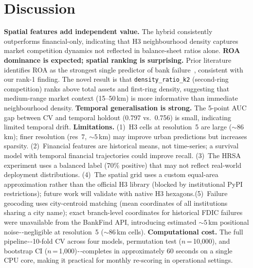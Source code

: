 \documentclass[conference]{IEEEtran}
\begin{document}
\section{Discussion}
\textbf{Spatial features add independent value.} The hybrid consistently
outperforms financial-only, indicating that H3 neighbourhood density
captures market competition dynamics not reflected in balance-sheet ratios
alone.
\textbf{ROA dominance is expected; spatial ranking is surprising.} Prior
literature identifies ROA as the strongest single predictor of bank
failure~\cite{cole1998,betz2014}, consistent with our rank-1 finding.
The novel result is that \texttt{density\_ratio\_k2} (second-ring
competition) ranks above total assets and first-ring density, suggesting
that medium-range market context (15–50\,km) is more informative than
immediate neighbourhood density.
\textbf{Temporal generalisation is strong.} The 5-point AUC gap between
CV and temporal holdout (0.797 vs.\ 0.756) is small, indicating limited
temporal drift.
\textbf{Limitations.}
(1)~H3 cells at resolution~5 are large (${\sim}86$\,km); finer resolution
(res~7, ${\sim}5$\,km) may improve urban predictions but increases
sparsity.
(2)~Financial features are historical means, not time-series; a survival
model with temporal financial trajectories could improve recall.
(3)~The HRSA experiment uses a balanced label (70\% positive) that may
not reflect real-world deployment distributions.
(4)~The spatial grid uses a custom equal-area approximation rather than
the official H3 library (blocked by institutional PyPI restrictions);
future work will validate with native H3 hexagons.(5)~Failure geocoding uses city-centroid matching (mean coordinates of
all institutions sharing a city name); exact branch-level coordinates
for historical FDIC failures were unavailable from the BankFind API,
introducing estimated ${{\sim}}5$\,km positional noise - -negligible at
resolution~5 (${{\sim}}86$\,km cells).
\textbf{Computational cost.}
The full pipeline - -10-fold CV across four models, permutation test
($n$\,=\,10,000), and bootstrap CI ($n$\,=\,1,000) - -completes in
approximately 60 seconds on a single CPU core, making it practical for
monthly re-scoring in operational settings.
\end{document}
